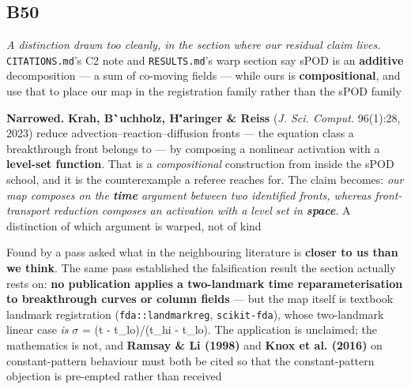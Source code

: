 \documentclass[10pt]{article}
\begin{document}
\subsection*{B50}\label{led:B50}
\begin{description}[leftmargin=0pt,itemsep=1pt]
\item[Defect.] \emph{A distinction drawn too cleanly, in the section where our residual claim lives.} \texttt{CITATIONS.md}'s C2 note and \texttt{RESULTS.md}'s warp section say sPOD is an \textbf{additive} decomposition --- a sum of co-moving fields --- while ours is \textbf{compositional}, and use that to place our map in the registration family rather than the sPOD family
\item[Resolution.] \textbf{Narrowed.} \textbf{Krah, B\``uchholz, H\''aringer \& Reiss} (\emph{J. Sci. Comput.} 96(1):28, 2023) reduce advection--reaction--diffusion fronts --- the equation class a breakthrough front belongs to --- by composing a nonlinear activation with a \textbf{level-set function}. That is a \emph{compositional} construction from inside the sPOD school, and it is the counterexample a referee reaches for. The claim becomes: \emph{our map composes on the \textbf{time} argument between two identified fronts, whereas front-transport reduction composes an activation with a level set in \textbf{space}}. A distinction of which argument is warped, not of kind
\item[Note.] Found by a pass asked what in the neighbouring literature is \textbf{closer to us than we think}. The same pass established the falsification result the section actually rests on: \textbf{no publication applies a two-landmark time reparameterisation to breakthrough curves or column fields} --- but the map itself is textbook landmark registration (\texttt{fda::landmarkreg}, \texttt{scikit-fda}), whose two-landmark linear case \emph{is} $\sigma$ = (t - t\_lo)/(t\_hi - t\_lo). The application is unclaimed; the mathematics is not, and \textbf{Ramsay \& Li (1998)} and \textbf{Knox et al. (2016)} on constant-pattern behaviour must both be cited so that the constant-pattern objection is pre-empted rather than received
\end{description}
\end{document}
